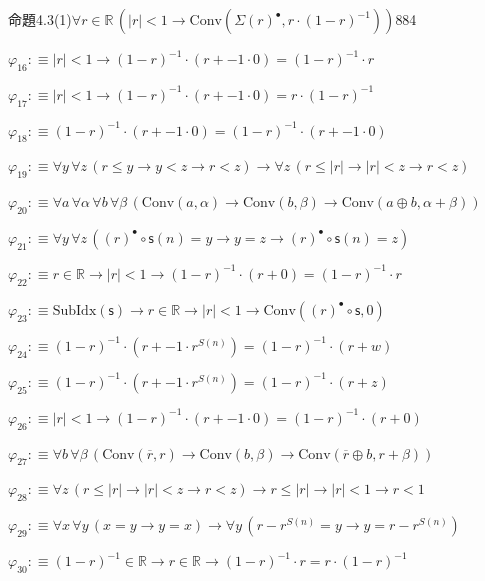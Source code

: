 \begin{fullproof}{命題4.3(1)}{$\forall r \in \mathbb{R}\,(\lvert r \rvert < 1 \to \mathrm{Conv}(\Sigma {(r)^{\bullet}},r \cdot (1 - r)^{-1}))$}{884}
\begin{abbrevlist}
\item $\varphi_{16} :\equiv \lvert r \rvert < 1 \to (1 - r)^{-1} \cdot (r + -1 \cdot 0) = (1 - r)^{-1} \cdot r$
\item $\varphi_{17} :\equiv \lvert r \rvert < 1 \to (1 - r)^{-1} \cdot (r + -1 \cdot 0) = r \cdot (1 - r)^{-1}$
\item $\varphi_{18} :\equiv (1 - r)^{-1} \cdot (r + -1 \cdot 0) = (1 - r)^{-1} \cdot (r + -1 \cdot 0)$
\item $\varphi_{19} :\equiv \forall y\,\forall z\,(r \leq y \to y < z \to r < z) \to \forall z\,(r \leq \lvert r \rvert \to \lvert r \rvert < z \to r < z)$
\item $\varphi_{20} :\equiv \forall a\,\forall \alpha\,\forall b\,\forall \beta\,(\mathrm{Conv}(a,\alpha) \to \mathrm{Conv}(b,\beta) \to \mathrm{Conv}(a \oplus b,\alpha + \beta))$
\item $\varphi_{21} :\equiv \forall y\,\forall z\,({(r)^{\bullet}} \circ \mathsf{s}(n) = y \to y = z \to {(r)^{\bullet}} \circ \mathsf{s}(n) = z)$
\item $\varphi_{22} :\equiv r \in \mathbb{R} \to \lvert r \rvert < 1 \to (1 - r)^{-1} \cdot (r + 0) = (1 - r)^{-1} \cdot r$
\item $\varphi_{23} :\equiv \mathrm{SubIdx}(\mathsf{s}) \to r \in \mathbb{R} \to \lvert r \rvert < 1 \to \mathrm{Conv}({(r)^{\bullet}} \circ \mathsf{s},0)$
\item $\varphi_{24} :\equiv (1 - r)^{-1} \cdot (r + -1 \cdot {{r}^{S(n)}}) = (1 - r)^{-1} \cdot (r + w)$
\item $\varphi_{25} :\equiv (1 - r)^{-1} \cdot (r + -1 \cdot {{r}^{S(n)}}) = (1 - r)^{-1} \cdot (r + z)$
\item $\varphi_{26} :\equiv \lvert r \rvert < 1 \to (1 - r)^{-1} \cdot (r + -1 \cdot 0) = (1 - r)^{-1} \cdot (r + 0)$
\item $\varphi_{27} :\equiv \forall b\,\forall \beta\,(\mathrm{Conv}(\overline{r},r) \to \mathrm{Conv}(b,\beta) \to \mathrm{Conv}(\overline{r} \oplus b,r + \beta))$
\item $\varphi_{28} :\equiv \forall z\,(r \leq \lvert r \rvert \to \lvert r \rvert < z \to r < z) \to r \leq \lvert r \rvert \to \lvert r \rvert < 1 \to r < 1$
\item $\varphi_{29} :\equiv \forall x\,\forall y\,(x = y \to y = x) \to \forall y\,(r - {{r}^{S(n)}} = y \to y = r - {{r}^{S(n)}})$
\item $\varphi_{30} :\equiv (1 - r)^{-1} \in \mathbb{R} \to r \in \mathbb{R} \to (1 - r)^{-1} \cdot r = r \cdot (1 - r)^{-1}$

\end{abbrevlist}
\end{fullproof}
